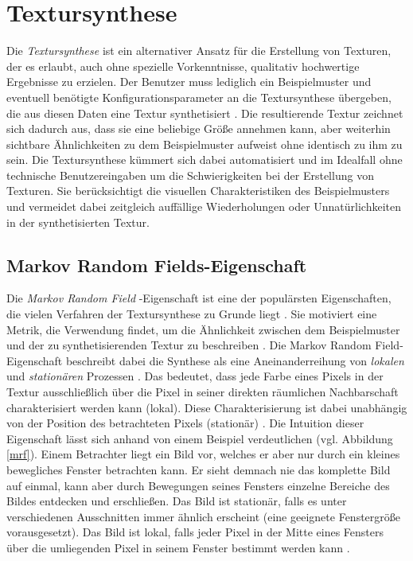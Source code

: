 \section{Textursynthese}

Die \emph{Textursynthese} ist ein alternativer Ansatz für die Erstellung von Texturen, der es erlaubt, auch ohne spezielle Vorkenntnisse, qualitativ hochwertige Ergebnisse zu erzielen.
Der Benutzer muss lediglich ein Beispielmuster und eventuell benötigte Konfigurationsparameter an die Textursynthese übergeben, die aus diesen Daten eine Textur synthetisiert \cite{StateOfTheArt}.
Die resultierende Textur zeichnet sich dadurch aus, dass sie eine beliebige Größe annehmen kann, aber weiterhin sichtbare Ähnlichkeiten zu dem Beispielmuster aufweist ohne identisch zu ihm zu sein.
Die Textursynthese kümmert sich dabei automatisiert und im Idealfall ohne technische Benutzereingaben um die Schwierigkeiten bei der Erstellung von Texturen.
Sie berücksichtigt die visuellen Charakteristiken des Beispielmusters und vermeidet dabei zeitgleich auffällige Wiederholungen oder Unnatürlichkeiten in der synthetisierten Textur.

\subsection{\glqq Markov Random Fields\grqq -Eigenschaft}

Die \emph{\glqq Markov Random Field\grqq} -Eigenschaft ist eine der populärsten Eigenschaften, die vielen Verfahren der Textursynthese zu Grunde liegt \cite{StateOfTheArt}.
Sie motiviert eine Metrik, die Verwendung findet, um die Ähnlichkeit zwischen dem Beispielmuster und der zu synthetisierenden Textur zu beschreiben \cite{TextureOptimization}.
Die \glqq Markov Random Field\grqq -Eigenschaft beschreibt dabei die Synthese als eine Aneinanderreihung von \emph{lokalen} und \emph{stationären} Prozessen \cite{StateOfTheArt}.
Das bedeutet, dass jede Farbe eines Pixels in der Textur ausschließlich über die Pixel in seiner direkten räumlichen Nachbarschaft charakterisiert werden kann (lokal).
Diese Charakterisierung ist dabei unabhängig von der Position des betrachteten Pixels (stationär) \cite{TextureOptimization}.
Die Intuition dieser Eigenschaft lässt sich anhand von einem Beispiel verdeutlichen (vgl. Abbildung \ref{mrf}).
Einem Betrachter liegt ein Bild vor, welches er aber nur durch ein kleines bewegliches Fenster betrachten kann.
Er sieht demnach nie das komplette Bild auf einmal, kann aber durch Bewegungen seines Fensters einzelne Bereiche des Bildes entdecken und erschließen.
Das Bild ist stationär, falls es unter verschiedenen Ausschnitten immer ähnlich erscheint (eine geeignete Fenstergröße vorausgesetzt).
Das Bild ist lokal, falls jeder Pixel in der Mitte eines Fensters über die umliegenden Pixel in seinem Fenster bestimmt werden kann \cite{StateOfTheArt}.

